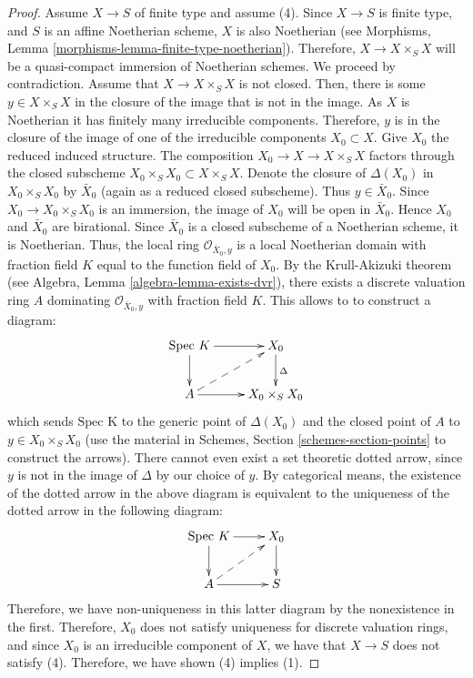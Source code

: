 \begin{proof}
\medskip\noindent
Assume $X \to S$ of finite type and assume (4).
Since $X \to S$ is finite type, and $S$ is an affine Noetherian
scheme, $X$ is also Noetherian (see
Morphisms, Lemma \ref{morphisms-lemma-finite-type-noetherian}).
Therefore, $X \to X \times_S X$ will
be a quasi-compact immersion of Noetherian schemes.  We proceed by
contradiction.  Assume that $X \to X \times_S X$ is not closed.  Then,
there is some $y \in X \times_S X$ in the closure of the image that is
not in the image. As $X$ is Noetherian it has finitely many irreducible
components. Therefore, $y$ is in the closure of the image of one of
the irreducible components $X_0 \subset X$.  Give $X_0$ the reduced
induced structure.  The composition $X_0 \to X \to X \times_S X$
factors through the closed subscheme $X_0 \times_S X_0 \subset X \times_S X$.
Denote the closure of $\Delta(X_0)$ in $X_0 \times_S X_0$
by $\bar X_0$ (again as a reduced closed subscheme). Thus $y \in \bar X_0$.
Since $X_0 \to X_0 \times_S X_0$ is an immersion, the image of $X_0$
will be open in $\bar X_0$. Hence $X_0$ and $\bar X_0$ are
birational. Since $\bar{X}_0$ is a closed subscheme of a
Noetherian scheme, it is Noetherian. Thus, the local ring
$\mathcal O_{{\bar X_0, y}}$ is a local Noetherian domain with fraction
field $K$ equal to the function field of $X_0$.  By the Krull-Akizuki
theorem (see Algebra, Lemma \ref{algebra-lemma-exists-dvr}), there exists a
discrete valuation ring $A$ dominating $\mathcal O_{{\bar X_0, y}}$
with fraction field $K$.  This allows to to construct a diagram:
\begin{equation}
\xymatrix{
\text{Spec }K \ar[r] \ar[d] & X_0 \ar[d]^{\Delta} \\
A \ar[r] \ar@{-->}[ur]& X_0 \times_S X_0 \\
}
\end{equation}
which sends $\text{Spec K}$ to the generic point of $\Delta(X_0)$ and
the closed point of $A$ to $y \in X_0 \times_S X_0$ (use the material in
Schemes, Section \ref{schemes-section-points} to construct the arrows).
There cannot even exist
a set theoretic dotted arrow, since $y$ is not in the image of
$\Delta$ by our choice of $y$.  By categorical means, the existence of
the dotted arrow in the above diagram is equivalent to the uniqueness
of the dotted arrow in the following diagram:
\begin{equation}
\xymatrix {
\text{Spec } K \ar[r] \ar[d] & X_0 \ar[d]\\
A \ar[r] \ar@{-->}[ur] & S \\
}
\end{equation}
Therefore, we have non-uniqueness in this latter diagram by the
nonexistence in the first.  Therefore, $X_0$ does not satisfy
uniqueness for discrete valuation rings, and since $X_0$ is an
irreducible component of $X$, we have that $X \to S$ does not satisfy
(4).  Therefore, we have shown (4) implies (1).
\end{proof}

